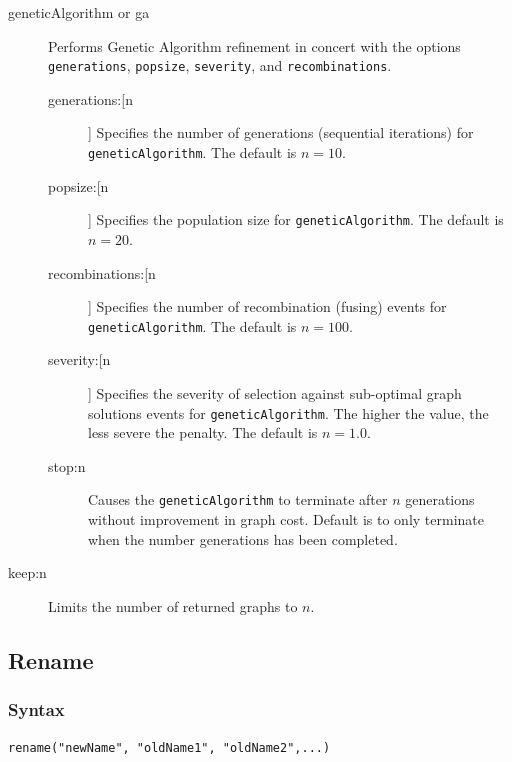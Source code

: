 \begin{description}
					
		\item[geneticAlgorithm or ga] Performs Genetic Algorithm \citep{Holland1975} refinement in 
		concert with the options \texttt{generations}, \texttt{popsize}, \texttt{severity}, and 
		\texttt{recombinations}. 
			
			\begin{description}
		
			\item[generations:[n]] Specifies the number of generations (sequential iterations) for 
			\texttt{geneticAlgorithm}. The default is $n=10$.

			\item[popsize:[n]] Specifies the population size for \texttt{geneticAlgorithm}. The default is 
			$n=20$.
			
			\item[recombinations:[n]] Specifies the number of recombination (fusing) events for 
			\texttt{geneticAlgorithm}. The default is $n=100$.
			
			\item[severity:[n]] Specifies the severity of selection against sub-optimal graph solutions 
			events for \texttt{geneticAlgorithm}. The higher the value, the less severe the penalty. The 
			default is $n=1.0$.
			
			\item[stop:n] Causes the \texttt{geneticAlgorithm} to terminate after $n$ generations without 
			improvement in graph cost.  Default is to only terminate when the number generations has 
			been completed.

			\end{description}
		
		\item[keep:n] Limits the number of returned graphs to $n$. 
		
		\end{description}
	
\subsection{Rename}
	\label{subsec:Rename}
	\subsubsection{Syntax}
		\texttt{rename("newName", "oldName1", "oldName2",...)}
		
